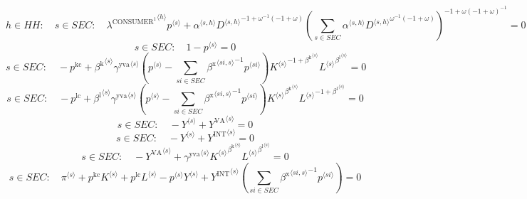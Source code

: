 \begin{equation}
h\in {H\!H}\colon\quad s\in {S\!E\!C}\colon\quad {{\lambda^{\mathrm{CONSUMER}^{\mathrm{1}}}}^{\langle h\rangle}} {{p}^{\langle s\rangle}} + {{\alpha}^{\langle s,h\rangle}} {{{D}^{\langle s,h\rangle}}^{-1 + {\omega}^{-1} \left(-1 + \omega\right)}} {\left(\sum_{s\in {S\!E\!C}} {{\alpha}^{\langle s,h\rangle}} {{{D}^{\langle s,h\rangle}}^{{\omega}^{-1} \left(-1 + \omega\right)}}\right)^{-1 + {\omega} \left(-1 + \omega\right)^{-1}}} = 0
\end{equation}
\begin{equation}
s\in {S\!E\!C}\colon\quad 1 - {p}^{\langle s\rangle} = 0
\end{equation}
\begin{equation}
s\in {S\!E\!C}\colon\quad -p^{\mathrm{kc}} + {{\beta^{\mathrm{k}}}^{\langle s\rangle}} {{\gamma^{\mathrm{yva}}}^{\langle s\rangle}} \left({p}^{\langle s\rangle} - \sum_{{s\!i}\in {S\!E\!C}} {{\beta^{\mathrm{x}}}^{\langle {s\!i},s\rangle}}^{-1} {{p}^{\langle {s\!i}\rangle}}\right) {{{K}^{\langle s\rangle}}^{-1 + {\beta^{\mathrm{k}}}^{\langle s\rangle}}} {{{L}^{\langle s\rangle}}^{{\beta^{\mathrm{l}}}^{\langle s\rangle}}} = 0
\end{equation}
\begin{equation}
s\in {S\!E\!C}\colon\quad -p^{\mathrm{lc}} + {{\beta^{\mathrm{l}}}^{\langle s\rangle}} {{\gamma^{\mathrm{yva}}}^{\langle s\rangle}} \left({p}^{\langle s\rangle} - \sum_{{s\!i}\in {S\!E\!C}} {{\beta^{\mathrm{x}}}^{\langle {s\!i},s\rangle}}^{-1} {{p}^{\langle {s\!i}\rangle}}\right) {{{K}^{\langle s\rangle}}^{{\beta^{\mathrm{k}}}^{\langle s\rangle}}} {{{L}^{\langle s\rangle}}^{-1 + {\beta^{\mathrm{l}}}^{\langle s\rangle}}} = 0
\end{equation}
\begin{equation}
s\in {S\!E\!C}\colon\quad -{Y}^{\langle s\rangle} + {Y^{\mathrm{VA}}}^{\langle s\rangle} = 0
\end{equation}
\begin{equation}
s\in {S\!E\!C}\colon\quad -{Y}^{\langle s\rangle} + {Y^{\mathrm{INT}}}^{\langle s\rangle} = 0
\end{equation}
\begin{equation}
s\in {S\!E\!C}\colon\quad -{Y^{\mathrm{VA}}}^{\langle s\rangle} + {{\gamma^{\mathrm{yva}}}^{\langle s\rangle}} {{{K}^{\langle s\rangle}}^{{\beta^{\mathrm{k}}}^{\langle s\rangle}}} {{{L}^{\langle s\rangle}}^{{\beta^{\mathrm{l}}}^{\langle s\rangle}}} = 0
\end{equation}
\begin{equation}
s\in {S\!E\!C}\colon\quad {\pi}^{\langle s\rangle} + {p^{\mathrm{kc}}} {{K}^{\langle s\rangle}} + {p^{\mathrm{lc}}} {{L}^{\langle s\rangle}} - {{p}^{\langle s\rangle}} {{Y}^{\langle s\rangle}} + {{Y^{\mathrm{INT}}}^{\langle s\rangle}} \left(\sum_{{s\!i}\in {S\!E\!C}} {{\beta^{\mathrm{x}}}^{\langle {s\!i},s\rangle}}^{-1} {{p}^{\langle {s\!i}\rangle}}\right) = 0
\end{equation}
